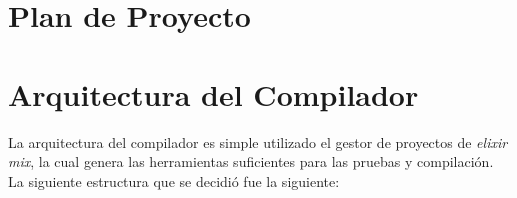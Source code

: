 \documentclass{article}
\begin{document}
\section{Plan de Proyecto}

\begin{figure}[H]
  \centering
  \vspace{10mm}
\end{figure}

\section{Arquitectura del Compilador}

La arquitectura del compilador es simple utilizado el gestor de proyectos de \textit{elixir}
\textit{mix}, la cual genera las herramientas suficientes para las pruebas y compilación. La
siguiente estructura que se decidió fue la siguiente:
\end{document}
